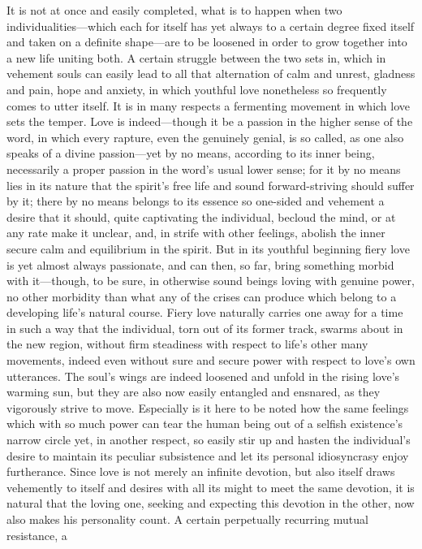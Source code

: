 \documentclass[12pt,a4paper]{book}
\begin{document}
It is not at once and easily completed, what is to happen when two
individualities---which each for itself has yet always to a certain degree
fixed itself and taken on a definite shape---are to be loosened in order to
grow together into a new life uniting both. A certain struggle between the
two sets in, which in vehement souls can easily lead to all that
alternation of calm and unrest, gladness and pain, hope and anxiety, in
which youthful love nonetheless so frequently comes to utter itself. It is
in many respects a fermenting movement in which love sets the temper. Love
is indeed---though it be a passion in the higher sense of the word, in which
every rapture, even the genuinely genial, is so called, as one also speaks
of a divine passion---yet by no means, according to its inner being,
necessarily a proper passion in the word's usual lower sense; for it by no
means lies in its nature that the spirit's free life and sound
forward-striving should suffer by it; there by no means belongs to its
essence so one-sided and vehement a desire that it should, quite
captivating the individual, becloud the mind, or at any rate make it
unclear, and, in strife with other feelings, abolish the inner secure calm
and equilibrium in the spirit. But in its youthful beginning fiery love is
yet almost always passionate, and can then, so far, bring something morbid
with it---though, to be sure, in otherwise sound beings loving with genuine
power, no other morbidity than what any of the crises can produce which
belong to a developing life's natural course. Fiery love naturally carries
one away for a time in such a way that the individual, torn out of its
former track, swarms about in the new region, without firm steadiness with
respect to life's other many movements, indeed even without sure and secure
power with respect to love's own utterances. The soul's wings are indeed
loosened and unfold in the rising love's warming sun, but they are also now
easily entangled and ensnared, as they vigorously strive to move.
Especially is it here to be noted how the same feelings which with so much
power can tear the human being out of a selfish existence's narrow circle
yet, in another respect, so easily stir up and hasten the individual's
desire to maintain its peculiar subsistence and let its personal
idiosyncrasy enjoy furtherance. Since love is not merely an infinite
devotion, but also itself draws vehemently to itself and desires with all
its might to meet the same devotion, it is natural that the loving one,
seeking and expecting this devotion in the other, now also makes his
personality count. A certain perpetually recurring mutual resistance, a
\end{document}
